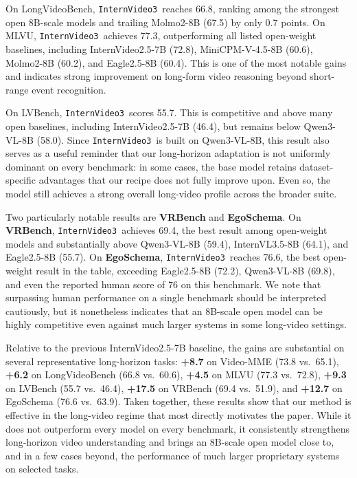 \documentclass[11pt, letterpaper]{template}
\theoremstyle{plain}
\theoremstyle{definition}
\theoremstyle{remark}
\newcommand{\name}{\texttt{InternVideo3}\xspace}
\begin{document}
On LongVideoBench, \name\ reaches 66.8, ranking among the strongest open 8B-scale models and trailing Molmo2-8B (67.5) by only 0.7 points. On MLVU, \name\ achieves 77.3, outperforming all listed open-weight baselines, including InternVideo2.5-7B (72.8), MiniCPM-V-4.5-8B (60.6), Molmo2-8B (60.2), and Eagle2.5-8B (60.4). This is one of the most notable gains and indicates strong improvement on long-form video reasoning beyond short-range event recognition.

On LVBench, \name\ scores 55.7. This is competitive and above many open baselines, including InternVideo2.5-7B (46.4), but remains below Qwen3-VL-8B (58.0). Since \name\ is built on Qwen3-VL-8B, this result also serves as a useful reminder that our long-horizon adaptation is not uniformly dominant on every benchmark: in some cases, the base model retains dataset-specific advantages that our recipe does not fully improve upon. Even so, the model still achieves a strong overall long-video profile across the broader suite.

Two particularly notable results are \textbf{VRBench} and \textbf{EgoSchema}. On \textbf{VRBench}, \name\ achieves 69.4, the best result among open-weight models and substantially above Qwen3-VL-8B (59.4), InternVL3.5-8B (64.1), and Eagle2.5-8B (55.7). On \textbf{EgoSchema}, \name\ reaches 76.6, the best open-weight result in the table, exceeding Eagle2.5-8B (72.2), Qwen3-VL-8B (69.8), and even the reported human score of 76 on this benchmark. We note that surpassing human performance on a single benchmark should be interpreted cautiously, but it nonetheless indicates that an 8B-scale open model can be highly competitive even against much larger systems in some long-video settings.

Relative to the previous InternVideo2.5-7B baseline, the gains are substantial on several representative long-horizon tasks: \textbf{+8.7} on Video-MME (73.8 vs.\ 65.1), \textbf{+6.2} on LongVideoBench (66.8 vs.\ 60.6), \textbf{+4.5} on MLVU (77.3 vs.\ 72.8), \textbf{+9.3} on LVBench (55.7 vs.\ 46.4), \textbf{+17.5} on VRBench (69.4 vs.\ 51.9), and \textbf{+12.7} on EgoSchema (76.6 vs.\ 63.9). Taken together, these results show that our method is effective in the long-video regime that most directly motivates the paper. While it does not outperform every model on every benchmark, it consistently strengthens long-horizon video understanding and brings an 8B-scale open model close to, and in a few cases beyond, the performance of much larger proprietary systems on selected tasks.
\end{document}
